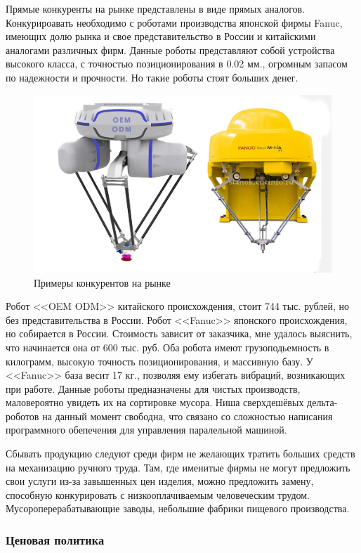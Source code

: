 Прямые конкуренты на рынке представлены в виде прямых аналогов. Конкурироавать необходимо с роботами производства японской фирмы Fanuc, имеющих долю рынка и свое представительство в России и китайскими аналогами различных фирм. Данные роботы представляют собой устройства высокого класса, с точностью позиционирования в 0.02 мм., огромным запасом по надежности и прочности. Но такие роботы стоят больших денег.

\begin{figure}[h]
\centering
\includegraphics[width=0.8\linewidth]{./image/odm}
\caption{Примеры конкурентов на рынке}
\end{figure} 

Робот <<OEM ODM>> китайского происхождения, стоит 744 тыс. рублей, но без представительства в России. Робот <<Fanuc>> японского происхождения, но собирается в России. Стоимость зависит от заказчика, мне удалось выяснить, что начинается она от 600 тыс. руб. Оба робота имеют грузоподьемность в килограмм, высокую точность позиционирования, и массивную базу. У <<Fanuc>> база весит 17 кг., позволяя ему избегать вибраций, возникающих при работе. Данные роботы предназначены для чистых производств, маловероятно увидеть их на сортировке мусора. Ниша сверхдешёвых дельта-роботов на данный момент свободна, что связано со сложностью написания программного обепечения для управления паралельной машиной.

Сбывать продукцию следуют среди фирм не желающих тратить больших средств на механизацию ручного труда. Там, где именитые фирмы не могут предложить свои услуги из-за завышенных цен изделия, можно предложить замену, способную конкурировать с низкооплачиваемым человеческим трудом. Мусороперерабатывающие заводы, небольшие фабрики пищевого производства. 

\subsubsection{Ценовая политика}

